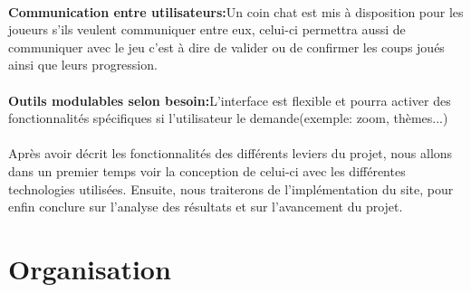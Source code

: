 \documentclass[12pt, openany]{report}
\begin{document}
\paragraph{}
\textbf{Communication entre utilisateurs:}\newline Un coin chat est mis à disposition pour les joueurs s’ils veulent communiquer entre eux, celui-ci permettra aussi de communiquer avec le jeu c’est à dire de valider ou de confirmer les coups joués ainsi que leurs progression.
\paragraph{}
\textbf{Outils modulables selon besoin:}\newline L'interface est flexible et pourra activer des fonctionnalités spécifiques si l'utilisateur le demande(exemple: zoom, thèmes...)

\paragraph{}
Après avoir décrit les fonctionnalités des différents leviers du projet, nous allons dans un premier temps voir la conception de celui-ci avec les différentes technologies utilisées.\newline
Ensuite, nous traiterons de l'implémentation du site, pour enfin conclure sur l'analyse des résultats et sur l'avancement du projet.


\section{Organisation}
\end{document}
